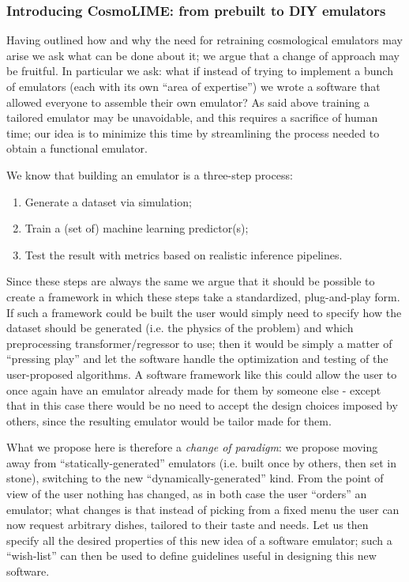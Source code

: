 \subsubsection{Introducing CosmoLIME: from prebuilt to DIY emulators}
Having outlined how and why the need for retraining cosmological emulators may arise we ask what can be done about it; we argue that a change of approach may be fruitful. In particular we ask: what if instead of trying to implement a bunch of emulators (each with its own ``area of expertise'') we wrote a software that allowed everyone to assemble their own emulator? As said above training a tailored emulator may be unavoidable, and this requires a sacrifice of human time; our idea is to minimize this time by streamlining the process needed to obtain a functional emulator.

We know that building an emulator is a three-step process:
\begin{enumerate}
    \item Generate a dataset via simulation;
    \item Train a (set of) machine learning predictor(s);
    \item Test the result with metrics based on realistic inference pipelines.
\end{enumerate}
Since these steps are always the same we argue that it should be possible to create a framework in which these steps take a standardized, plug-and-play form. If such a framework could be built the user would simply need to specify how the dataset should be generated (i.e. the physics of the problem) and which preprocessing transformer/regressor to use; then it would be simply a matter of ``pressing play'' and let the software handle the optimization and testing of the user-proposed algorithms. A software framework like this could allow the user to once again have an emulator already made for them by someone else - except that in this case there would be no need to accept the design choices imposed by others, since the resulting emulator would be tailor made for them.

What we propose here is therefore a \emph{change of paradigm}: we propose moving away from ``statically-generated'' emulators (i.e. built once by others, then set in stone), switching to the new ``dynamically-generated'' kind. From the point of view of the user nothing has changed, as in both case the user ``orders'' an emulator; what changes is that instead of picking from a fixed menu the user can now request arbitrary dishes, tailored to their taste and needs. 
Let us then specify all the desired properties of this new idea of a software emulator; such a ``wish-list'' can then be used to define guidelines useful in designing this new software.


